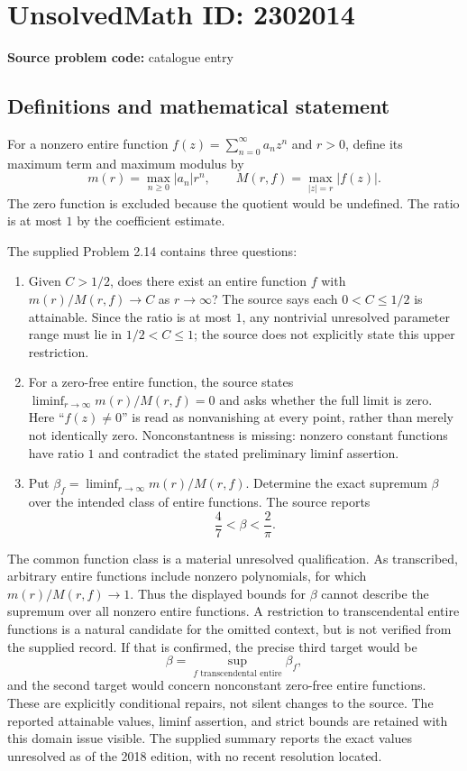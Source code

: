 \documentclass[11pt]{article}
\begin{document}
\section*{UnsolvedMath ID: 2302014}
\textbf{Source problem code:} catalogue entry
\subsection{Definitions and mathematical statement}
For a nonzero entire function $f(z)=\sum_{n=0}^\infty a_nz^n$ and $r>0$, define its maximum term and maximum modulus by
\[
m(r)=\max_{n\geq0}|a_n|r^n,\qquad
M(r,f)=\max_{|z|=r}|f(z)|.
\]
The zero function is excluded because the quotient would be undefined. The ratio is at most $1$ by the coefficient estimate.

The supplied Problem 2.14 contains three questions:
\begin{enumerate}
\item Given $C>1/2$, does there exist an entire function $f$ with $m(r)/M(r,f)\to C$ as $r\to\infty$? The source says each $0<C\leq1/2$ is attainable. Since the ratio is at most $1$, any nontrivial unresolved parameter range must lie in $1/2<C\leq1$; the source does not explicitly state this upper restriction.
\item For a zero-free entire function, the source states $\liminf_{r\to\infty}m(r)/M(r,f)=0$ and asks whether the full limit is zero. Here ``$f(z)\ne0$'' is read as nonvanishing at every point, rather than merely not identically zero. Nonconstantness is missing: nonzero constant functions have ratio $1$ and contradict the stated preliminary liminf assertion.
\item Put $\beta_f=\liminf_{r\to\infty}m(r)/M(r,f)$. Determine the exact supremum $\beta$ over the intended class of entire functions. The source reports
\[
\frac47<\beta<\frac2\pi.
\]
\end{enumerate}
The common function class is a material unresolved qualification. As transcribed, arbitrary entire functions include nonzero polynomials, for which $m(r)/M(r,f)\to1$. Thus the displayed bounds for $\beta$ cannot describe the supremum over all nonzero entire functions. A restriction to transcendental entire functions is a natural candidate for the omitted context, but is not verified from the supplied record. If that is confirmed, the precise third target would be
\[
\beta=\sup_{f\text{ transcendental entire}}\beta_f,
\]
and the second target would concern nonconstant zero-free entire functions. These are explicitly conditional repairs, not silent changes to the source. The reported attainable values, liminf assertion, and strict bounds are retained with this domain issue visible. The supplied summary reports the exact values unresolved as of the 2018 edition, with no recent resolution located.
\end{document}
